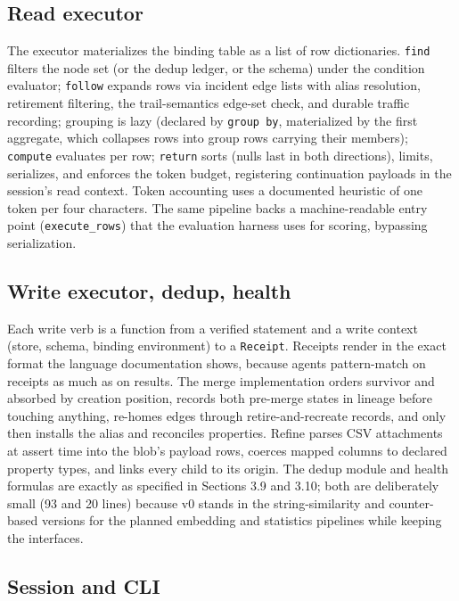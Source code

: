 \documentclass[11pt]{article}
\begin{document}
\subsection{Read executor}

The executor materializes the binding table as a list of row dictionaries. \texttt{find} filters the node set (or the dedup ledger, or the schema) under the condition evaluator; \texttt{follow} expands rows via incident edge lists with alias resolution, retirement filtering, the trail-semantics edge-set check, and durable traffic recording; grouping is lazy (declared by \texttt{group by}, materialized by the first aggregate, which collapses rows into group rows carrying their members); \texttt{compute} evaluates per row; \texttt{return} sorts (nulls last in both directions), limits, serializes, and enforces the token budget, registering continuation payloads in the session's read context. Token accounting uses a documented heuristic of one token per four characters. The same pipeline backs a machine-readable entry point (\texttt{execute\_rows}) that the evaluation harness uses for scoring, bypassing serialization.

\subsection{Write executor, dedup, health}

Each write verb is a function from a verified statement and a write context (store, schema, binding environment) to a \texttt{Receipt}. Receipts render in the exact format the language documentation shows, because agents pattern-match on receipts as much as on results. The merge implementation orders survivor and absorbed by creation position, records both pre-merge states in lineage before touching anything, re-homes edges through retire-and-recreate records, and only then installs the alias and reconciles properties. Refine parses CSV attachments at assert time into the blob's payload rows, coerces mapped columns to declared property types, and links every child to its origin. The dedup module and health formulas are exactly as specified in Sections 3.9 and 3.10; both are deliberately small (93 and 20 lines) because v0 stands in the string-similarity and counter-based versions for the planned embedding and statistics pipelines while keeping the interfaces.

\subsection{Session and CLI}
\end{document}
